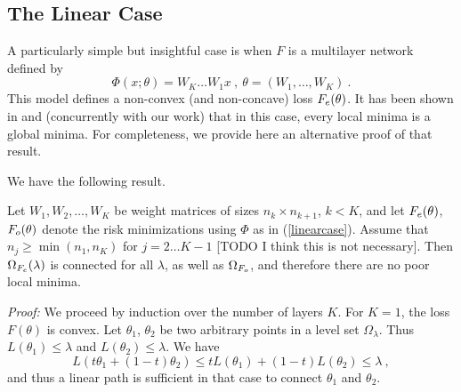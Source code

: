 \subsection{The Linear Case}

A particularly simple but insightful case is 
when $F$ is a multilayer network defined by
\begin{equation}
\label{linearcase}
\Phi(x;\theta) = W_K \dots W_1 x~,~\theta = (W_1, \dots, W_K)~.
\end{equation}
This model defines a non-convex (and non-concave) loss $F_{e}(\theta)$.
It has been shown in \cite{ganguli} and \cite{linearcase} (concurrently with our work) that in this case, 
every local minima is a global minima.  
For completeness, we provide here an alternative proof of that result.


We have the following result.
\begin{proposition}
\label{proplinear}
Let $W_1, W_2, \dots, W_K$ be weight matrices of sizes 
$n_k \times n_{k+1}$, $k < K$, and let $F_{e}(\theta)$, $F_{o}(\theta)$ 
denote the risk minimizations using $\Phi$ as in (\ref{linearcase}).
Assume that $n_j \geq \min(n_1, n_K)$ for $j=2 \dots K-1$ [TODO I think this is not necessary].
Then $\Omega_{F_{e}}(\lambda)$ is connected for all $\lambda$, as well as $\Omega_{F_{o}}$, 
and therefore there are no poor local minima.  
\end{proposition}
{\it Proof:} We proceed by induction over the number of layers $K$. 
For $K=1$, the loss $F(\theta)$ is convex. Let  $\theta_1$, $\theta_2$ be two arbitrary points 
in a level set $\Omega_\lambda$. Thus $L(\theta_1) \leq \lambda$ and $L(\theta_2) \leq \lambda$. We have
$$L( t \theta_1 + (1-t) \theta_2) \leq t L(\theta_1) + (1-t) L(\theta_2) \leq \lambda~,$$
and thus a linear path is sufficient in that case to connect $\theta_1$ and $\theta_2$.

